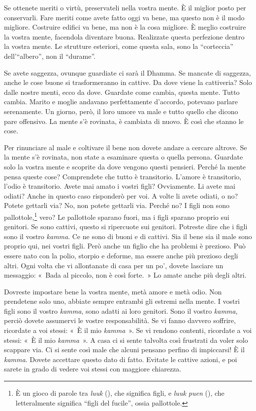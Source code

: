 Se ottenete meriti o virtù, preservateli nella vostra mente. È il
miglior posto per conservarli. Fare meriti come avete fatto oggi va
bene, ma questo non è il modo migliore. Costruire edifici va bene, ma
non è la cosa migliore. È meglio costruire la vostra mente, facendola
diventare buona. Realizzate questa perfezione dentro la vostra mente. Le
strutture esteriori, come questa sala, sono la ``corteccia''
dell'``albero'', non il ``durame''.

Se avete saggezza, ovunque guardiate ci sarà il Dhamma. Se mancate di
saggezza, anche le cose buone si trasformeranno in cattive. Da dove
viene la cattiveria? Solo dalle nostre menti, ecco da dove. Guardate
come cambia, questa mente. Tutto cambia. Marito e moglie andavano
perfettamente d'accordo, potevano parlare serenamente. Un giorno, però,
il loro umore va male e tutto quello che dicono pare offensivo. La mente
s'è rovinata, è cambiata di nuovo. È così che stanno le cose.

Per rinunciare al male e coltivare il bene non dovete andare a cercare
altrove. Se la mente s'è rovinata, non state a esaminare questa o quella
persona. Guardate solo la vostra mente e scoprite da dove vengono questi
pensieri. Perché la mente pensa queste cose? Comprendete che tutto è
transitorio. L'amore è transitorio, l'odio è transitorio. Avete mai
amato i vostri figli? Ovviamente. Li avete mai odiati? Anche in questo
caso risponderò per voi. A volte li avete odiati, o no? Potete gettarli
via? No, non potete gettarli via. Perché no? I figli non sono
pallottole,\footnote{È un gioco di parole tra \emph{luuk} (), che
  significa figli, e \emph{luuk puen} (), che letteralmente
  significa ``figli del fucile'', ossia pallottole.} vero? Le pallottole
sparano fuori, ma i figli sparano proprio sui genitori. Se sono cattivi,
questo si ripercuote sui genitori. Potreste dire che i figli sono il
vostro \emph{kamma}. Ce ne sono di buoni e di cattivi. Sia il bene sia
il male sono proprio qui, nei vostri figli. Però anche un figlio che ha
problemi è prezioso. Può essere nato con la polio, storpio e deforme, ma
essere anche più prezioso degli altri. Ogni volta che vi allontanate di
casa per un po', dovete lasciare un messaggio: «~Bada al piccolo, non è
così forte.~» Lo amate anche più degli altri.

Dovreste impostare bene la vostra mente, metà amore e metà odio. Non
prendetene solo uno, abbiate sempre entrambi gli estremi nella mente. I
vostri figli sono il vostro \emph{kamma}, sono adatti ai loro genitori.
Sono il vostro \emph{kamma}, perciò dovete assumervi le vostre
responsabilità. Se vi fanno davvero soffrire, ricordate a voi stessi:
«~È il mio \emph{kamma}~». Se vi rendono contenti, ricordate a voi
stessi: «~È il mio \emph{kamma}~». A casa ci si sente talvolta così
frustrati da voler solo scappare via. Ci si sente così male che alcuni
pensano perfino di impiccarsi! È il \emph{kamma}. Dovete accettare
questo dato di fatto. Evitate le cattive azioni, e poi sarete in grado
di vedere voi stessi con maggiore chiarezza.

